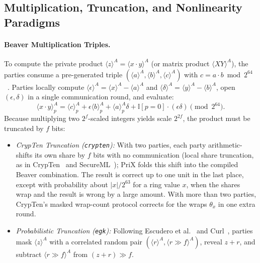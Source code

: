 \documentclass[11pt]{article}
\newcommand{\shareA}[1]{\langle #1 \rangle^{A}}
\begin{document}
\subsection{Multiplication, Truncation, and Nonlinearity Paradigms}
\paragraph{Beaver Multiplication Triples.}
To compute the private product $\shareA{z} = \shareA{x \cdot y}$ (or matrix product $\shareA{X Y}$), the parties consume a pre-generated triple $(\shareA{a}, \shareA{b}, \shareA{c})$ with $c = a \cdot b \bmod 2^{64}$~\cite{beaver1991efficient}. Parties locally compute $\shareA{\epsilon} = \shareA{x} - \shareA{a}$ and $\shareA{\delta} = \shareA{y} - \shareA{b}$, open $(\epsilon, \delta)$ in a single communication round, and evaluate:
\begin{equation}
    \shareA{x \cdot y}_p = \shareA{c}_p + \epsilon \shareA{b}_p + \shareA{a}_p \delta + \mathbb{I}[p = 0] \cdot (\epsilon \delta) \pmod{2^{64}}.
    \label{eq:beaver}
\end{equation}
Because multiplying two $2^f$-scaled integers yields scale $2^{2f}$, the product must be truncated by $f$ bits:
\begin{itemize}
    \item \emph{CrypTen Truncation (\texttt{crypten}):} With two parties, each party arithmetic-shifts its own share by $f$ bits with no communication (local share truncation, as in CrypTen~\cite{knott2021crypten} and SecureML~\cite{mohassel2017secureml}); PriX folds this shift into the compiled Beaver combination. The result is correct up to one unit in the last place, except with probability about $|x|/2^{63}$ for a ring value $x$, when the shares wrap and the result is wrong by a large amount. With more than two parties, CrypTen's masked wrap-count protocol corrects for the wraps $\theta_x$ in one extra round.
    \item \emph{Probabilistic Truncation (\texttt{egk}):} Following Escudero et al.~\cite{escudero2020improved} and Curl~\cite{santos2024curl}, parties mask $\shareA{z}$ with a correlated random pair $(\shareA{r}, \shareA{r \gg f})$, reveal $z + r$, and subtract $\shareA{r \gg f}$ from $(z + r) \gg f$.
\end{itemize}
\end{document}
